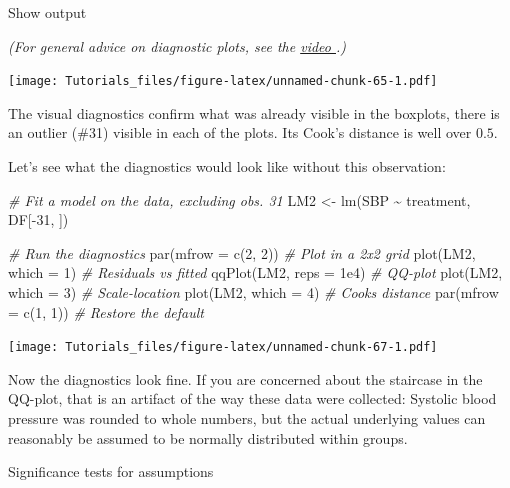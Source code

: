 \documentclass[
]{book}
\newenvironment{Shaded}{\begin{snugshade}}{\end{snugshade}}
\newcommand{\AttributeTok}[1]{\textcolor[rgb]{0.77,0.63,0.00}{#1}}
\newcommand{\CommentTok}[1]{\textcolor[rgb]{0.56,0.35,0.01}{\textit{#1}}}
\newcommand{\DecValTok}[1]{\textcolor[rgb]{0.00,0.00,0.81}{#1}}
\newcommand{\FloatTok}[1]{\textcolor[rgb]{0.00,0.00,0.81}{#1}}
\newcommand{\FunctionTok}[1]{\textcolor[rgb]{0.00,0.00,0.00}{#1}}
\newcommand{\NormalTok}[1]{#1}
\newcommand{\OtherTok}[1]{\textcolor[rgb]{0.56,0.35,0.01}{#1}}
\newcommand{\SpecialCharTok}[1]{\textcolor[rgb]{0.00,0.00,0.00}{#1}}
\begin{document}
Show output

\emph{(For general advice on diagnostic plots, see the \href{https://youtu.be/upJJmfSbBuQ}{video }.)}

\texttt{[image: Tutorials\_files/figure-latex/unnamed-chunk-65-1.pdf]}

The visual diagnostics confirm what was already visible in the boxplots, there is an outlier (\#31) visible in each of the plots. Its Cook's distance is well over \(0.5\).

Let's see what the diagnostics would look like without this observation:

\begin{Shaded}
\begin{Highlighting}[]
\CommentTok{\# Fit a model on the data, excluding obs. 31}
\NormalTok{LM2 }\OtherTok{\textless{}{-}} \FunctionTok{lm}\NormalTok{(SBP }\SpecialCharTok{\textasciitilde{}}\NormalTok{ treatment, DF[}\SpecialCharTok{{-}}\DecValTok{31}\NormalTok{, ])}

\CommentTok{\# Run the diagnostics}
\FunctionTok{par}\NormalTok{(}\AttributeTok{mfrow =} \FunctionTok{c}\NormalTok{(}\DecValTok{2}\NormalTok{, }\DecValTok{2}\NormalTok{))    }\CommentTok{\# Plot in a 2x2 grid}
\FunctionTok{plot}\NormalTok{(LM2, }\AttributeTok{which =} \DecValTok{1}\NormalTok{)    }\CommentTok{\# Residuals vs fitted}
\FunctionTok{qqPlot}\NormalTok{(LM2, }\AttributeTok{reps =} \FloatTok{1e4}\NormalTok{) }\CommentTok{\# QQ{-}plot}
\FunctionTok{plot}\NormalTok{(LM2, }\AttributeTok{which =} \DecValTok{3}\NormalTok{)    }\CommentTok{\# Scale{-}location}
\FunctionTok{plot}\NormalTok{(LM2, }\AttributeTok{which =} \DecValTok{4}\NormalTok{)    }\CommentTok{\# Cook\textquotesingle{}s distance}
\FunctionTok{par}\NormalTok{(}\AttributeTok{mfrow =} \FunctionTok{c}\NormalTok{(}\DecValTok{1}\NormalTok{, }\DecValTok{1}\NormalTok{))    }\CommentTok{\# Restore the default}
\end{Highlighting}
\end{Shaded}

\texttt{[image: Tutorials\_files/figure-latex/unnamed-chunk-67-1.pdf]}

Now the diagnostics look fine. If you are concerned about the staircase in the QQ-plot, that is an artifact of the way these data were collected: Systolic blood pressure was rounded to whole numbers, but the actual underlying values can reasonably be assumed to be normally distributed within groups.

Significance tests for assumptions
\end{document}
